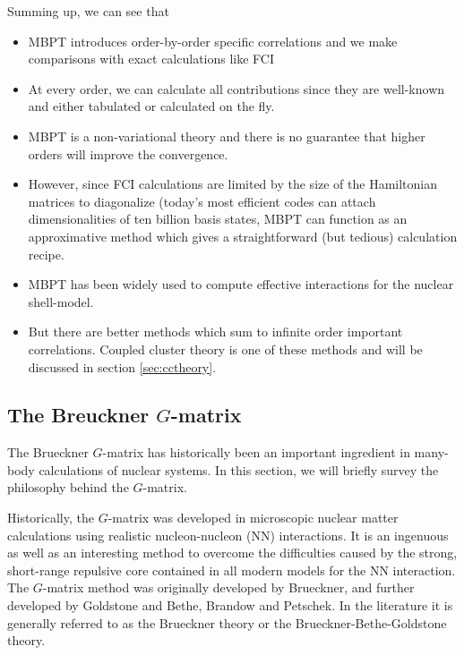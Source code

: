Summing up, we can see that
\begin{itemize}
\item MBPT introduces order-by-order specific correlations and we make comparisons with exact calculations like FCI

\item At every order, we can calculate all contributions since they are well-known and either tabulated or calculated on the fly.

\item MBPT is a non-variational theory and there is no guarantee that higher orders will improve the convergence. 

\item However, since FCI calculations are limited by the size of the Hamiltonian matrices to diagonalize (today's most efficient codes can attach dimensionalities of ten billion basis states, MBPT can function as an approximative method which gives a straightforward (but tedious) calculation recipe. 

\item MBPT has been widely used to compute effective interactions for the nuclear shell-model.

\item But there are better methods which sum to infinite order important correlations. Coupled cluster theory is one of these methods and will be discussed in section \ref{sec:cctheory}. 
\end{itemize}




\subsection{The Breuckner $G$-matrix}\label{subsec:gmatrix}

The Brueckner $G$-matrix has historically been an important ingredient
in many-body calculations of nuclear systems. In this section, we will
briefly survey the philosophy behind the $G$-matrix.

Historically, the $G$-matrix was developed in microscopic nuclear
matter calculations using realistic nucleon-nucleon (NN) interactions.
It is an ingenuous as well as an interesting method to overcome the
difficulties caused by the strong, short-range repulsive core contained
in all modern models for the NN interaction. The $G$-matrix method was
originally developed by Brueckner, and further
developed by Goldstone and Bethe, Brandow and Petschek. 
In the literature it is generally referred to as the
Brueckner theory or the Brueckner-Bethe-Goldstone theory.

